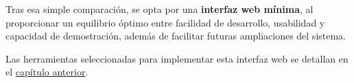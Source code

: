 Tras esa simple comparación, se opta por una \textbf{interfaz web mínima}, al proporcionar un equilibrio óptimo entre facilidad de desarrollo, 
usabilidad y capacidad de demostración, además de facilitar futuras ampliaciones del sistema.

Las herramientas seleccionadas para implementar esta interfaz web se detallan en el \hyperref[sec:interfaz-herramientas]{capítulo anterior}.